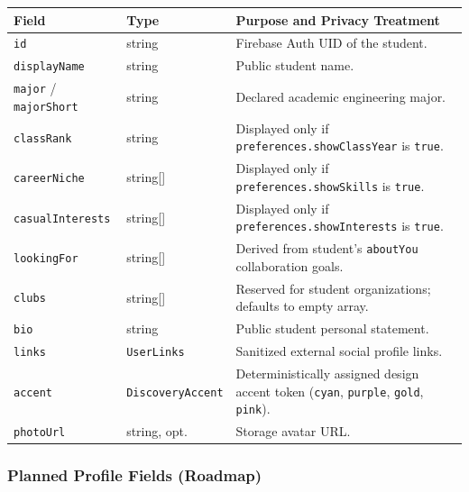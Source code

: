 \documentclass[11pt,letterpaper]{article}
\begin{document}
\begin{table}[h!]
\centering
\small
\begin{tabularx}{\textwidth}{p{3.2cm} p{2.2cm} Y}
\toprule
\textbf{Field} & \textbf{Type} & \textbf{Purpose and Privacy Treatment} \\
\midrule
\texttt{id} & string & Firebase Auth UID of the student. \\
\texttt{displayName} & string & Public student name. \\
\texttt{major} / \texttt{majorShort} & string & Declared academic engineering major. \\
\texttt{classRank} & string & Displayed only if \texttt{preferences.showClassYear} is \texttt{true}. \\
\texttt{careerNiche} & string[] & Displayed only if \texttt{preferences.showSkills} is \texttt{true}. \\
\texttt{casualInterests} & string[] & Displayed only if \texttt{preferences.showInterests} is \texttt{true}. \\
\texttt{lookingFor} & string[] & Derived from student's \texttt{aboutYou} collaboration goals. \\
\texttt{clubs} & string[] & Reserved for student organizations; defaults to empty array. \\
\texttt{bio} & string & Public student personal statement. \\
\texttt{links} & \texttt{UserLinks} & Sanitized external social profile links. \\
\texttt{accent} & \texttt{DiscoveryAccent} & Deterministically assigned design accent token (\texttt{cyan}, \texttt{purple}, \texttt{gold}, \texttt{pink}). \\
\texttt{photoUrl} & string, opt. & Storage avatar URL. \\
\bottomrule
\end{tabularx}
\end{table}

\subsubsection*{Planned Profile Fields (Roadmap)}
\end{document}
